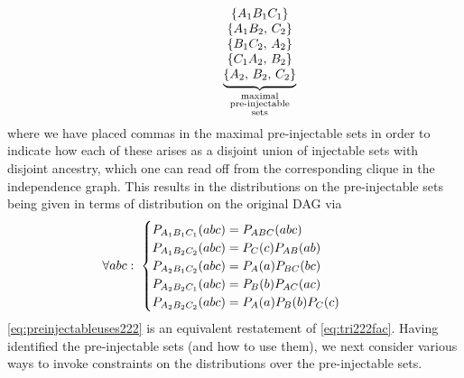 \begin{align}
\qquad\qquad
{\underbrace{\begin{matrix}
\\
\left\lbrace A_1 B_1 C_1\right\rbrace \\
\left\lbrace A_1 B_2,\, C_2\right\rbrace \\
\left\lbrace B_1 C_2,\, A_2\right\rbrace \\
\left\lbrace C_1 A_2,\, B_2\right\rbrace \\
\left\lbrace A_2,\, B_2,\, C_2\right\rbrace
\end{matrix}}_{\substack{\text{maximal}\\\text{pre-injectable}\\\text{sets}}}}
\end{align}
where we have placed commas in the maximal pre-injectable sets in order to indicate how each of these arises as a disjoint union of injectable sets with disjoint ancestry, which one can read off from the corresponding clique in the independence graph. This results in the distributions on the pre-injectable sets being given in terms of distribution on the original DAG via
\begin{align}\label{eq:preinjectableuses222}
\begin{split}
&\forall{a b c}:\; \begin{cases}
\pdf[A_1 B_1 C_1]{a b c} = \pdf[A B C]{a b c} \\
\pdf[A_1 B_2 C_2]{a b c} = \pdf[C]{c}\pdf[A B]{a b}\\%
\pdf[A_2 B_1 C_2]{a b c} = \pdf[A]{a}\pdf[B C]{b c}\\
\pdf[A_2 B_2 C_1]{a b c} = \pdf[B]{b}\pdf[A C]{a c}\\
\pdf[A_2 B_2 C_2]{a b c} = \pdf[A]{a}\pdf[B]{b}\pdf[C]{c}
\end{cases}\end{split}
\end{align}
\cref{eq:preinjectableuses222} is an equivalent restatement of \cref{eq:tri222fac}. Having identified the pre-injectable sets (and how to use them), we next consider various ways to invoke constraints on the distributions over the pre-injectable sets.


\label{step:marginalsproblem}

